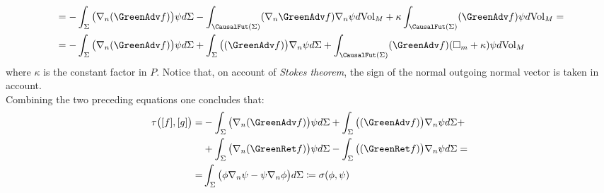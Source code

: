 \documentclass[Main]{subfiles}
\begin{document}
\begin{example}
\begin{align}
			&= -\int_\Sigma \big( \nabla_n ( \GreenAdv f) \big) \psi d\Sigma 
				- \int_{\CausalFut(\Sigma)} (\nabla_n \GreenAdv f) \nabla_n \psi d\textrm{Vol}_M 
				+ \kappa \int_{\CausalFut(\Sigma)} ( \GreenAdv f) \psi d\textrm{Vol}_M  =\nonumber\\
			&= -\int_\Sigma \big( \nabla_n ( \GreenAdv f) \big) \psi d\Sigma 	+\int_\Sigma \big( ( \GreenAdv f) \big)\nabla_n  \psi d\Sigma  + \int_{\CausalFut(\Sigma)} ( \GreenAdv f) ( \square_m + \kappa) \psi d\textrm{Vol}_M
		\end{align}
		where $\kappa$ is the constant factor in $P$.
		Notice that, on account of \emph{Stokes theorem},  the sign of the normal outgoing normal vector is taken in account.\\
		Combining the two preceding equations one concludes that:
		\begin{align}
		\tau\big( [f], [g] \big) =&  -\int_\Sigma \big( \nabla_n ( \GreenAdv f) \big) \psi d\Sigma
		+\int_\Sigma \big( ( \GreenAdv f) \big)\nabla_n  \psi d\Sigma +\nonumber\\
		&+\int_\Sigma \big( \nabla_n ( \GreenRet f) \big) \psi d\Sigma  
		-\int_\Sigma \big( ( \GreenRet f) \big)\nabla_n  \psi d\Sigma =  \nonumber\\
		=& \int_\Sigma \big( \phi \nabla_n \psi - \psi \nabla_n \phi \big) d\Sigma \coloneqq\sigma (\phi, \psi)
		\end{align}
		
	\end{example}
\end{document}
